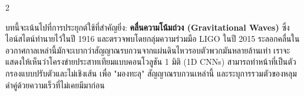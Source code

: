 \begin{paracol}{2}
\begin{thai}
บทนี้จะเน้นไปที่การประยุกต์ใช้ที่สำคัญยิ่ง: \textbf{คลื่นความโน้มถ่วง (Gravitational Waves)} ซึ่งไอน์สไตน์ทำนายไว้ในปี 1916 และตรวจพบโดยกลุ่มความร่วมมือ LIGO ในปี 2015 ระลอกคลื่นในอวกาศกาลเหล่านี้มักจะเบากว่าสัญญาณรบกวนจากแผ่นดินไหวรอบตัวพวกมันหลายล้านเท่า เราจะแสดงให้เห็นว่าโครงข่ายประสาทเทียมแบบคอนโวลูชัน 1 มิติ (1D CNNs) สามารถทำหน้าที่เป็นตัวกรองแบบปรับตัวและไม่เชิงเส้น เพื่อ "มองทะลุ" สัญญาณรบกวนเหล่านี้ และระบุการรวมตัวของหลุมดำคู่ด้วยความเร็วที่ไม่เคยมีมาก่อน
\end{thai}
\end{paracol}
